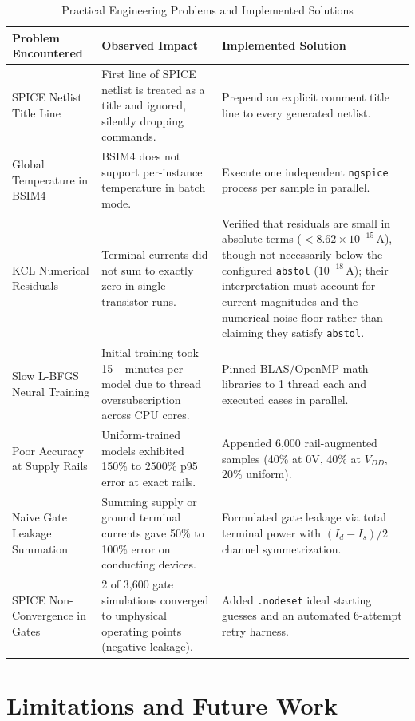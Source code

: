 \documentclass[11pt,a4paper]{article}
\numberwithin{table}{section}
\numberwithin{figure}{section}
\begin{document}
\begin{table}[H]
\centering
\caption{Practical Engineering Problems and Implemented Solutions}
\label{tab:problems}
\begin{tabularx}{\textwidth}{lXX}
\toprule
\textbf{Problem Encountered} & \textbf{Observed Impact} & \textbf{Implemented Solution} \\
\midrule
SPICE Netlist Title Line & First line of SPICE netlist is treated as a title and ignored, silently dropping commands. & Prepend an explicit comment title line to every generated netlist. \\
Global Temperature in BSIM4 & BSIM4 does not support per-instance temperature in batch mode. & Execute one independent \texttt{ngspice} process per sample in parallel. \\
KCL Numerical Residuals & Terminal currents did not sum to exactly zero in single-transistor runs. & Verified that residuals are small in absolute terms ($< 8.62\times 10^{-15}\,\mathrm{A}$), though not necessarily below the configured \texttt{abstol} ($10^{-18}\,\mathrm{A}$); their interpretation must account for current magnitudes and the numerical noise floor rather than claiming they satisfy \texttt{abstol}. \\
Slow L-BFGS Neural Training & Initial training took 15+ minutes per model due to thread oversubscription across CPU cores. & Pinned BLAS/OpenMP math libraries to 1 thread each and executed cases in parallel. \\
Poor Accuracy at Supply Rails & Uniform-trained models exhibited 150\% to 2500\% p95 error at exact rails. & Appended 6,000 rail-augmented samples (40\% at 0V, 40\% at $V_{DD}$, 20\% uniform). \\
Naive Gate Leakage Summation & Summing supply or ground terminal currents gave 50\% to 100\% error on conducting devices. & Formulated gate leakage via total terminal power with $(I_d - I_s)/2$ channel symmetrization. \\
SPICE Non-Convergence in Gates & 2 of 3,600 gate simulations converged to unphysical operating points (negative leakage). & Added \texttt{.nodeset} ideal starting guesses and an automated 6-attempt retry harness. \\
\bottomrule
\end{tabularx}
\end{table}

\section{Limitations and Future Work}
\end{document}
